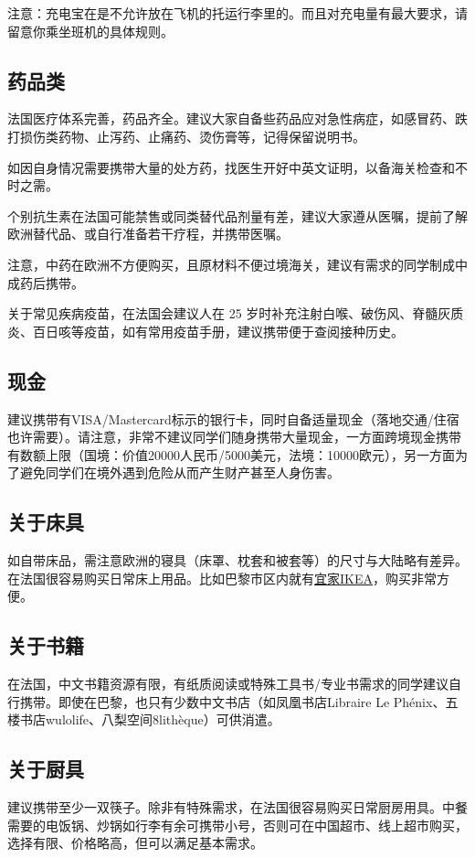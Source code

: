 注意：充电宝在是不允许放在飞机的托运行李里的。而且对充电量有最大要求，请留意你乘坐班机的具体规则。

\subsection{药品类}
法国医疗体系完善，药品齐全。建议大家自备些药品应对急性病症，如感冒药、跌打损伤类药物、止泻药、止痛药、烫伤膏等，记得保留说明书。

如因自身情况需要携带大量的处方药，找医生开好中英文证明，以备海关检查和不时之需。

个别抗生素在法国可能禁售或同类替代品剂量有差，建议大家遵从医嘱，提前了解欧洲替代品、或自行准备若干疗程，并携带医嘱。

注意，中药在欧洲不方便购买，且原材料不便过境海关，建议有需求的同学制成中成药后携带。

关于常见疾病疫苗，在法国会建议人在 25 岁时补充注射白喉、破伤风、脊髓灰质炎、百日咳等疫苗，如有常用疫苗手册，建议携带便于查阅接种历史。

\subsection{现金}
建议携带有VISA/Mastercard标示的银行卡，同时自备适量现金（落地交通/住宿也许需要）。请注意，非常不建议同学们随身携带大量现金，一方面跨境现金携带有数额上限（国境：价值20000人民币/5000美元，法境：10000欧元），另一方面为了避免同学们在境外遇到危险从而产生财产甚至人身伤害。

\subsection{关于床具}
如自带床品，需注意欧洲的寝具（床罩、枕套和被套等）的尺寸与大陆略有差异。在法国很容易购买日常床上用品。比如巴黎市区内就有\href{https://goo.gl/maps/zMbCesV2jhi92mcK9}{宜家IKEA}，购买非常方便。

\subsection{关于书籍}

在法国，中文书籍资源有限，有纸质阅读或特殊工具书/专业书需求的同学建议自行携带。即使在巴黎，也只有少数中文书店（如凤凰书店Libraire Le Phénix、五楼书店wulolife、八梨空间8lithèque）可供消遣。

\subsection{关于厨具}
建议携带至少一双筷子。除非有特殊需求，在法国很容易购买日常厨房用具。中餐需要的电饭锅、炒锅如行李有余可携带小号，否则可在中国超市、线上超市购买，选择有限、价格略高，但可以满足基本需求。

